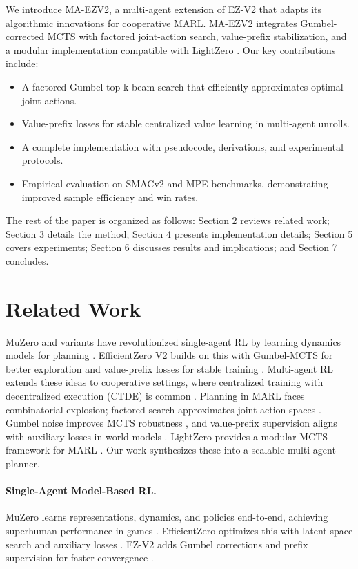 \documentclass[10pt]{article}
\begin{document}
We introduce MA-EZV2, a multi-agent extension of EZ-V2 that adapts its algorithmic innovations for cooperative MARL. MA-EZV2 integrates Gumbel-corrected MCTS with factored joint-action search, value-prefix stabilization, and a modular implementation compatible with LightZero \cite{lightzero2023}. Our key contributions include:
\begin{itemize}
  \item A factored Gumbel top-k beam search that efficiently approximates optimal joint actions.
  \item Value-prefix losses for stable centralized value learning in multi-agent unrolls.
  \item A complete implementation with pseudocode, derivations, and experimental protocols.
  \item Empirical evaluation on SMACv2 and MPE benchmarks, demonstrating improved sample efficiency and win rates.
\end{itemize}

The rest of the paper is organized as follows: Section 2 reviews related work; Section 3 details the method; Section 4 presents implementation details; Section 5 covers experiments; Section 6 discusses results and implications; and Section 7 concludes.

\section{Related Work}
MuZero and variants have revolutionized single-agent RL by learning dynamics models for planning \cite{schrittwieser2019mastering}. EfficientZero V2 builds on this with Gumbel-MCTS for better exploration and value-prefix losses for stable training \cite{wang2024efficientzero}. Multi-agent RL extends these ideas to cooperative settings, where centralized training with decentralized execution (CTDE) is common \cite{lowe2017multi}. Planning in MARL faces combinatorial explosion; factored search approximates joint action spaces \cite{bellemare2024multiagent,madz2020}. Gumbel noise improves MCTS robustness \cite{wang2024efficientzero}, and value-prefix supervision aligns with auxiliary losses in world models \cite{hafner2023dreamer}. LightZero provides a modular MCTS framework for MARL \cite{lightzero2023}. Our work synthesizes these into a scalable multi-agent planner.

\paragraph{Single-Agent Model-Based RL.} MuZero learns representations, dynamics, and policies end-to-end, achieving superhuman performance in games \cite{schrittwieser2019mastering}. EfficientZero optimizes this with latent-space search and auxiliary losses \cite{ye2021mastering}. EZ-V2 adds Gumbel corrections and prefix supervision for faster convergence \cite{wang2024efficientzero}.
\end{document}
